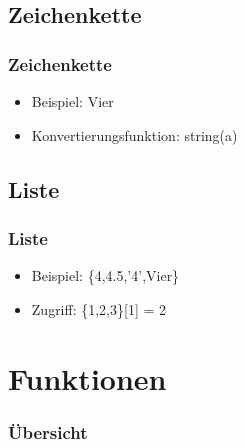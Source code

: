 \documentclass{beamer}
\begin{document}
\subsection{Zeichenkette}
\begin{frame}
\frametitle{Zeichenkette}
 \begin{itemize}
 \item Beispiel: \grqq Vier\grqq
\item Konvertierungsfunktion: string(a)
 \end{itemize}
\end{frame}
\subsection{Liste}
\begin{frame}
\frametitle{Liste}
 \begin{itemize}
 \item Beispiel: \{4,4.5,'4',\grqq Vier\grqq\}
\item Zugriff: \{1,2,3\}[1] = 2
 \end{itemize}
\end{frame}
\section{Funktionen}
  \begin{frame}[shrink]
    \frametitle{Übersicht}
    \tableofcontents[currentsection]
  \end{frame}
\end{document}
